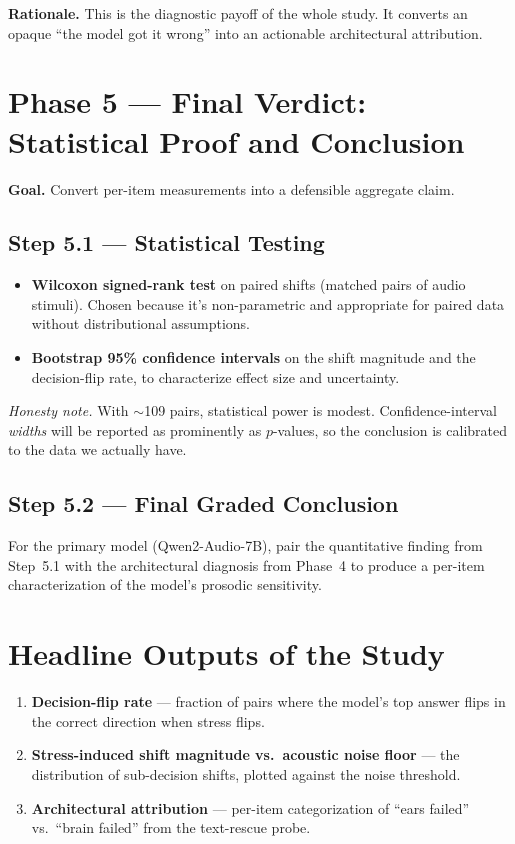 \documentclass[11pt]{article}
\begin{document}
\textbf{Rationale.} This is the diagnostic payoff of the whole study.
It converts an opaque ``the model got it wrong'' into an actionable
architectural attribution.

\section{Phase 5 --- Final Verdict: Statistical Proof and Conclusion}

\textbf{Goal.} Convert per-item measurements into a defensible
aggregate claim.

\subsection*{Step 5.1 --- Statistical Testing}

\begin{itemize}
    \item \textbf{Wilcoxon signed-rank test} on paired shifts
    (matched pairs of audio stimuli). Chosen because it's
    non-parametric and appropriate for paired data without
    distributional assumptions.
    \item \textbf{Bootstrap 95\% confidence intervals} on the shift
    magnitude and the decision-flip rate, to characterize effect
    size and uncertainty.
\end{itemize}

\textit{Honesty note.} With $\sim$109 pairs, statistical power is
modest. Confidence-interval \emph{widths} will be reported as
prominently as $p$-values, so the conclusion is calibrated to the
data we actually have.

\subsection*{Step 5.2 --- Final Graded Conclusion}

For the primary model (Qwen2-Audio-7B), pair the quantitative finding
from Step~5.1 with the architectural diagnosis from Phase~4 to produce
a per-item characterization of the model's prosodic sensitivity.

\section*{Headline Outputs of the Study}

\begin{enumerate}
    \item \textbf{Decision-flip rate} --- fraction of pairs where the
    model's top answer flips in the correct direction when stress
    flips.
    \item \textbf{Stress-induced shift magnitude vs.\ acoustic noise
    floor} --- the distribution of sub-decision shifts, plotted
    against the noise threshold.
    \item \textbf{Architectural attribution} --- per-item
    categorization of ``ears failed'' vs.\ ``brain failed'' from the
    text-rescue probe.
\end{enumerate}
\end{document}
